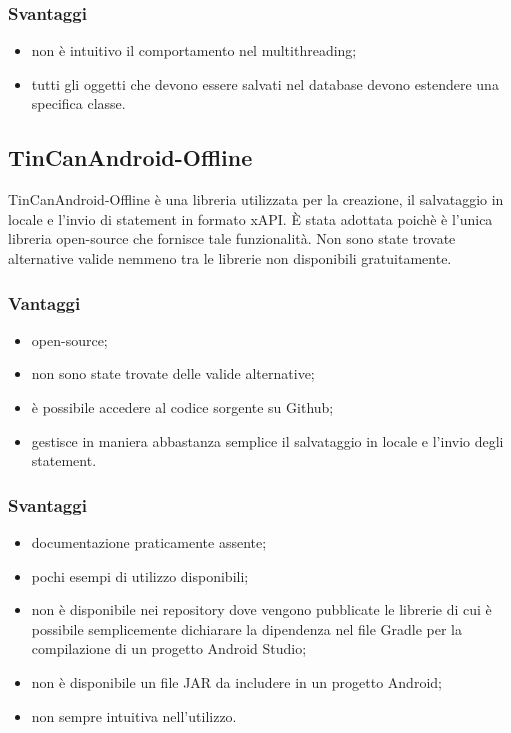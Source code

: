 \documentclass[../Tesi.tex]{subfiles}
\begin{document}
		\subsubsection{Svantaggi}
			\begin{itemize}
				\item non è intuitivo il comportamento nel multithreading;
				\item tutti gli oggetti che devono essere salvati nel database devono estendere una specifica classe.
			\end{itemize}

	\subsection{TinCanAndroid-Offline}
		TinCanAndroid-Offline è una libreria utilizzata per la creazione, il salvataggio in locale e l'invio di statement in formato xAPI. È stata adottata poichè è l'unica libreria open-source che fornisce tale funzionalità. Non sono state trovate alternative valide nemmeno tra le librerie non disponibili gratuitamente.
		\subsubsection{Vantaggi}
			\begin{itemize}
				\item open-source;
				\item non sono state trovate delle valide alternative;
				\item è possibile accedere al codice sorgente su Github;
				\item gestisce in maniera abbastanza semplice il salvataggio in locale e l'invio degli statement.
			\end{itemize}
		\subsubsection{Svantaggi}
			\begin{itemize}
				\item documentazione praticamente assente;
				\item pochi esempi di utilizzo disponibili;
				\item non è disponibile nei repository dove vengono pubblicate le librerie di cui è possibile semplicemente dichiarare la dipendenza nel file Gradle per la compilazione di un progetto Android Studio;
				\item non è disponibile un file JAR da includere in un progetto Android;
				\item non sempre intuitiva nell'utilizzo.
			\end{itemize}
	
\end{document}
